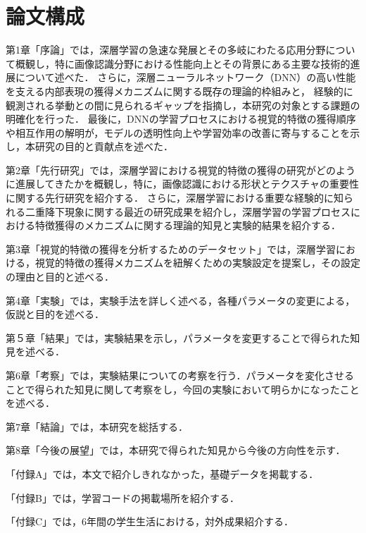 \section{論文構成}
第1章「序論」では，深層学習の急速な発展とその多岐にわたる応用分野について概観し，特に画像認識分野における性能向上とその背景にある主要な技術的進展について述べた．
さらに，深層ニューラルネットワーク（DNN）の高い性能を支える内部表現の獲得メカニズムに関する既存の理論的枠組みと，
経験的に観測される挙動との間に見られるギャップを指摘し，本研究の対象とする課題の明確化を行った．
最後に，DNNの学習プロセスにおける視覚的特徴の獲得順序や相互作用の解明が，モデルの透明性向上や学習効率の改善に寄与することを示し，本研究の目的と貢献点を述べた．\par
第2章「先行研究」では，深層学習における視覚的特徴の獲得の研究がどのように進展してきたかを概観し，特に，画像認識における形状とテクスチャの重要性に関する先行研究を紹介する．
さらに，深層学習における重要な経験的に知られる二重降下現象に関する最近の研究成果を紹介し，深層学習の学習プロセスにおける特徴獲得のメカニズムに関する理論的知見と実験的結果を紹介する．\par
第3章「視覚的特徴の獲得を分析するためのデータセット」では，深層学習における，視覚的特徴の獲得メカニズムを紐解くための実験設定を提案し，その設定の理由と目的と述べる．\par
第4章「実験」では，実験手法を詳しく述べる，各種パラメータの変更による，仮説と目的を述べる．\par
第５章「結果」では，実験結果を示し，パラメータを変更することで得られた知見を述べる．\par
第6章「考察」では，実験結果についての考察を行う．パラメータを変化させることで得られた知見に関して考察をし，今回の実験において明らかになったことを述べる．\par
第7章「結論」では，本研究を総括する．\par
第8章「今後の展望」では，本研究で得られた知見から今後の方向性を示す．\par
「付録A」では，本文で紹介しきれなかった，基礎データを掲載する．\par
「付録B」では，学習コードの掲載場所を紹介する．\par
「付録C」では，6年間の学生生活における，対外成果紹介する．\par
\newpage
